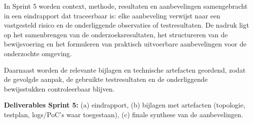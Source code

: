 In Sprint 5 worden context, methode, resultaten en aanbevelingen samengebracht
in een eindrapport dat traceerbaar is: elke aanbeveling verwijst naar een vastgesteld
risico en de onderliggende observaties of testresultaten. De nadruk ligt op het
samenbrengen van de onderzoeksresultaten, het structureren van de bewijsvoering
en het formuleren van praktisch uitvoerbare aanbevelingen voor de onderzochte
omgeving.

Daarnaast worden de relevante bijlagen en technische artefacten geordend, zodat
de gevolgde aanpak, de gebruikte testresultaten en de onderliggende bewijsstukken
controleerbaar blijven.

\textbf{Deliverables Sprint 5:} (a) eindrapport, (b) bijlagen met artefacten
(topologie, testplan, logs/PoC's waar toegestaan), (c) finale synthese van de
aanbevelingen.